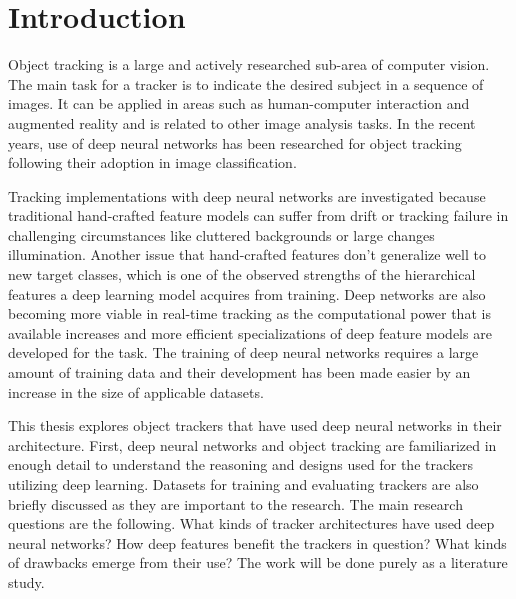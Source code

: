 \section{Introduction}
Object tracking is a large and actively researched sub-area of computer vision. The
main task for a tracker is to indicate the desired subject in a sequence of images.
It can be applied in areas such as human-computer interaction and augmented reality
and is related to other image analysis tasks. In the recent years, use of deep neural
networks has been researched for object tracking following their adoption in image
classification.

Tracking implementations with deep neural networks are investigated because traditional
hand-crafted feature models can suffer from drift or tracking failure in challenging
circumstances like cluttered backgrounds or large changes illumination. Another issue
that hand-crafted features don’t generalize well to new target classes, which is one
of the observed strengths of the hierarchical features a deep learning model acquires
from training. Deep networks are also becoming more viable in real-time tracking as
the computational power that is available increases and more efficient specializations
of deep feature models are developed for the task. The training of deep neural networks
requires a large amount of training data and their development has been made easier by
an increase in the size of applicable datasets.

This thesis explores object trackers that have used deep neural networks in their
architecture. First, deep neural networks and object tracking are familiarized in
enough detail to understand the reasoning and designs used for the trackers utilizing
deep learning. Datasets for training and evaluating trackers are also briefly discussed
as they are important to the research. The main research questions are the following.
What kinds of tracker architectures have used deep neural networks? How deep features
benefit the trackers in question? What kinds of drawbacks emerge from their use? The
work will be done purely as a literature study. 

